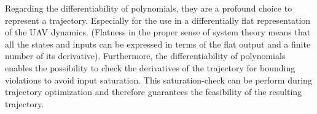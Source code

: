 Regarding the differentiability of polynomials, they are a profound choice to represent a trajectory. Especially for the use in a differentially flat representation of the UAV dynamics. (Flatness in the proper sense of system theory means that all the states and inputs can be expressed in terms of the flat output and a finite number of its derivative). \newline
Furthermore, the differentiability of polynomials enables the possibility to check the derivatives of the trajectory for bounding violations to avoid input saturation. This saturation-check can be perform during trajectory optimization and therefore guarantees the feasibility of the resulting trajectory.




